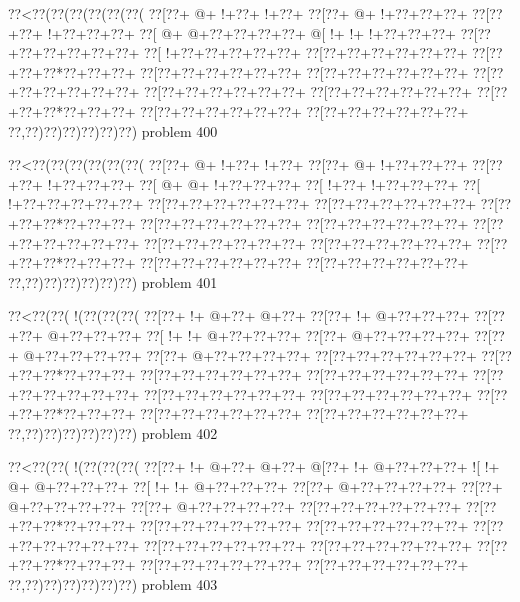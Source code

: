 \vbox{\vbox{\goo
\0??<\0??(\0??(\0??(\0??(\0??(\0??(
\0??[\0??+\- @+\- !+\0??+\- !+\0??+
\0??[\0??+\- @+\- !+\0??+\0??+\0??+
\0??[\0??+\0??+\- !+\0??+\0??+\0??+
\0??[\- @+\- @+\0??+\0??+\0??+\0??+
\- @[\- !+\- !+\- !+\0??+\0??+\0??+
\0??[\0??+\0??+\0??+\0??+\0??+\0??+
\0??[\- !+\0??+\0??+\0??+\0??+\0??+
\0??[\0??+\0??+\0??+\0??+\0??+\0??+
\0??[\0??+\0??+\0??*\0??+\0??+\0??+
\0??[\0??+\0??+\0??+\0??+\0??+\0??+
\0??[\0??+\0??+\0??+\0??+\0??+\0??+
\0??[\0??+\0??+\0??+\0??+\0??+\0??+
\0??[\0??+\0??+\0??+\0??+\0??+\0??+
\0??[\0??+\0??+\0??+\0??+\0??+\0??+
\0??[\0??+\0??+\0??*\0??+\0??+\0??+
\0??[\0??+\0??+\0??+\0??+\0??+\0??+
\0??[\0??+\0??+\0??+\0??+\0??+\0??+
\0??,\0??)\0??)\0??)\0??)\0??)\0??)
}
\hfil problem 400\hfil\break
}

\vbox{\vbox{\goo
\0??<\0??(\0??(\0??(\0??(\0??(\0??(
\0??[\0??+\- @+\- !+\0??+\- !+\0??+
\0??[\0??+\- @+\- !+\0??+\0??+\0??+
\0??[\0??+\0??+\- !+\0??+\0??+\0??+
\0??[\- @+\- @+\- !+\0??+\0??+\0??+
\0??[\- !+\0??+\- !+\0??+\0??+\0??+
\0??[\- !+\0??+\0??+\0??+\0??+\0??+
\0??[\0??+\0??+\0??+\0??+\0??+\0??+
\0??[\0??+\0??+\0??+\0??+\0??+\0??+
\0??[\0??+\0??+\0??*\0??+\0??+\0??+
\0??[\0??+\0??+\0??+\0??+\0??+\0??+
\0??[\0??+\0??+\0??+\0??+\0??+\0??+
\0??[\0??+\0??+\0??+\0??+\0??+\0??+
\0??[\0??+\0??+\0??+\0??+\0??+\0??+
\0??[\0??+\0??+\0??+\0??+\0??+\0??+
\0??[\0??+\0??+\0??*\0??+\0??+\0??+
\0??[\0??+\0??+\0??+\0??+\0??+\0??+
\0??[\0??+\0??+\0??+\0??+\0??+\0??+
\0??,\0??)\0??)\0??)\0??)\0??)\0??)
}
\hfil problem 401\hfil\break
}

\vbox{\vbox{\goo
\0??<\0??(\0??(\- !(\0??(\0??(\0??(
\0??[\0??+\- !+\- @+\0??+\- @+\0??+
\0??[\0??+\- !+\- @+\0??+\0??+\0??+
\0??[\0??+\0??+\- @+\0??+\0??+\0??+
\0??[\- !+\- !+\- @+\0??+\0??+\0??+
\0??[\0??+\- @+\0??+\0??+\0??+\0??+
\0??[\0??+\- @+\0??+\0??+\0??+\0??+
\0??[\0??+\- @+\0??+\0??+\0??+\0??+
\0??[\0??+\0??+\0??+\0??+\0??+\0??+
\0??[\0??+\0??+\0??*\0??+\0??+\0??+
\0??[\0??+\0??+\0??+\0??+\0??+\0??+
\0??[\0??+\0??+\0??+\0??+\0??+\0??+
\0??[\0??+\0??+\0??+\0??+\0??+\0??+
\0??[\0??+\0??+\0??+\0??+\0??+\0??+
\0??[\0??+\0??+\0??+\0??+\0??+\0??+
\0??[\0??+\0??+\0??*\0??+\0??+\0??+
\0??[\0??+\0??+\0??+\0??+\0??+\0??+
\0??[\0??+\0??+\0??+\0??+\0??+\0??+
\0??,\0??)\0??)\0??)\0??)\0??)\0??)
}
\hfil problem 402\hfil\break
}

\vbox{\vbox{\goo
\0??<\0??(\0??(\- !(\0??(\0??(\0??(
\0??[\0??+\- !+\- @+\0??+\- @+\0??+
\- @[\0??+\- !+\- @+\0??+\0??+\0??+
\- ![\- !+\- @+\- @+\0??+\0??+\0??+
\0??[\- !+\- !+\- @+\0??+\0??+\0??+
\0??[\0??+\- @+\0??+\0??+\0??+\0??+
\0??[\0??+\- @+\0??+\0??+\0??+\0??+
\0??[\0??+\- @+\0??+\0??+\0??+\0??+
\0??[\0??+\0??+\0??+\0??+\0??+\0??+
\0??[\0??+\0??+\0??*\0??+\0??+\0??+
\0??[\0??+\0??+\0??+\0??+\0??+\0??+
\0??[\0??+\0??+\0??+\0??+\0??+\0??+
\0??[\0??+\0??+\0??+\0??+\0??+\0??+
\0??[\0??+\0??+\0??+\0??+\0??+\0??+
\0??[\0??+\0??+\0??+\0??+\0??+\0??+
\0??[\0??+\0??+\0??*\0??+\0??+\0??+
\0??[\0??+\0??+\0??+\0??+\0??+\0??+
\0??[\0??+\0??+\0??+\0??+\0??+\0??+
\0??,\0??)\0??)\0??)\0??)\0??)\0??)
}
\hfil problem 403\hfil\break
}

